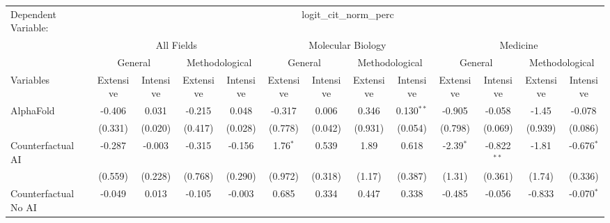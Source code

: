 \begingroup
\centering
\begin{tabular}{lcccccccccccc}
   \tabularnewline \midrule \midrule
   Dependent Variable: & \multicolumn{12}{c}{logit\_cit\_norm\_perc}\\
 & \multicolumn{4}{c}{All Fields} & \multicolumn{4}{c}{Molecular Biology} & \multicolumn{4}{c}{Medicine} \\
\cmidrule(lr){2-5} \cmidrule(lr){6-9} \cmidrule(lr){10-13}
 & \multicolumn{2}{c}{General} & \multicolumn{2}{c}{Methodological} & \multicolumn{2}{c}{General} & \multicolumn{2}{c}{Methodological} & \multicolumn{2}{c}{General} & \multicolumn{2}{c}{Methodological} \\
\cmidrule(lr){2-3} \cmidrule(lr){4-5} \cmidrule(lr){6-7} \cmidrule(lr){8-9} \cmidrule(lr){10-11} \cmidrule(lr){12-13}
Variables & \multicolumn{1}{c}{Extensive} & \multicolumn{1}{c}{Intensive} & \multicolumn{1}{c}{Extensive} & \multicolumn{1}{c}{Intensive} & \multicolumn{1}{c}{Extensive} & \multicolumn{1}{c}{Intensive} & \multicolumn{1}{c}{Extensive} & \multicolumn{1}{c}{Intensive} & \multicolumn{1}{c}{Extensive} & \multicolumn{1}{c}{Intensive} & \multicolumn{1}{c}{Extensive} & \multicolumn{1}{c}{Intensive} \\
\cmidrule(lr){1-1}\cmidrule(lr){2-2} \cmidrule(lr){3-3} \cmidrule(lr){4-4} \cmidrule(lr){5-5} \cmidrule(lr){6-6} \cmidrule(lr){7-7} \cmidrule(lr){8-8} \cmidrule(lr){9-9} \cmidrule(lr){10-10} \cmidrule(lr){11-11} \cmidrule(lr){12-12} \cmidrule(lr){13-13}
   AlphaFold                                & -0.406  & 0.031         & -0.215  & 0.048        & -0.317     & 0.006   & 0.346   & 0.130$^{**}$  & -0.905      & -0.058        & -1.45   & -0.078\\   
                                            & (0.331) & (0.020)       & (0.417) & (0.028)      & (0.778)    & (0.042) & (0.931) & (0.054)       & (0.798)     & (0.069)       & (0.939) & (0.086)\\   
   Counterfactual AI                        & -0.287  & -0.003        & -0.315  & -0.156       & 1.76$^{*}$ & 0.539   & 1.89    & 0.618         & -2.39$^{*}$ & -0.822$^{**}$ & -1.81   & -0.676$^{*}$\\   
                                            & (0.559) & (0.228)       & (0.768) & (0.290)      & (0.972)    & (0.318) & (1.17)  & (0.387)       & (1.31)      & (0.361)       & (1.74)  & (0.336)\\   
   Counterfactual No AI                     & -0.049  & 0.013         & -0.105  & -0.003       & 0.685      & 0.334   & 0.447   & 0.338         & -0.485      & -0.056        & -0.833  & -0.070$^{*}$\\   

\end{tabular}
